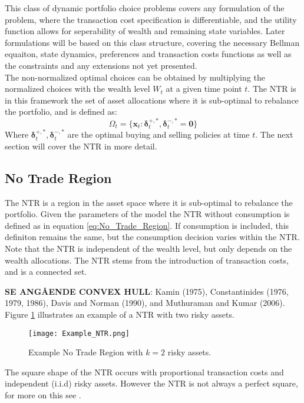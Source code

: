 \documentclass[11pt]{article}
\begin{document}
This class of dynamic portfolio choice problems covers any formulation of the problem,
where the transaction cost specification is differentiable, and the utility function allows for seperability of wealth and remaining state variables.
Later formulations will be based on this class structure, covering the necessary Bellman equaiton, state dynamics, preferences and transaction costs functions as well as the constraints
and any extensions not yet presented.\\
The non-normalized optimal choices can be obtained by multiplying the normalized choices with the wealth level $W_t$ at a given time point $t$.
The \ac{NTR} is in this framework the set of asset allocations where it is sub-optimal to rebalance the portfolio, and is defined as:
\begin{equation}
  \label{eq:No_Trade_Region}
  \Omega_t = \{ \mathbf{x}_{t} : \boldsymbol{\delta}^{+,*}_t , \boldsymbol{\delta}^{-,*}_t = \mathbf{0} \}
\end{equation}
Where $\boldsymbol{\delta}^{+,*}_t , \boldsymbol{\delta}^{-,*}_t$ are the optimal buying and selling policies at time $t$. 
The next section will cover the \ac{NTR} in more detail.

\subsection{No Trade Region} \label{Subsection: No-trade-region}
The \ac{NTR} is a region in the asset space where
it is sub-optimal to rebalance the portfolio.
Given the parameters of the model the \ac{NTR} without consumption is defined as in equation \eqref{eq:No_Trade_Region}.
If consumption is included, this definiton remains the same, but the consumption decision varies within the \ac{NTR}.
Note that the \ac{NTR} is independent of the wealth level, but only depends on the wealth allocations.
The \ac{NTR} stems from the introduction of transaction costs, and is a connected set.

\textbf{SE ANGÅENDE CONVEX HULL}: 
Kamin (1975), Constantinides (1976, 1979, 1986),
Davis and Norman (1990), and Muthuraman and Kumar (2006). 
Figure \ref{fig: NTR_Example} illustrates an example of a \ac{NTR} with two risky assets.
\begin{figure}[h!]
  \begin{center}
  \caption{Example No Trade Region with $k=2$ risky assets.} 
  \label{fig: NTR_Example}
  \texttt{[image: Example\_NTR.png]}
  \end{center}
\end{figure}
The square shape of the \ac{NTR} occurs with proportional transaction costs
and independent (i.i.d) risky assets. However the NTR is not always a perfect square, for more on this see \autocite{Dybvig2020}.
\end{document}
